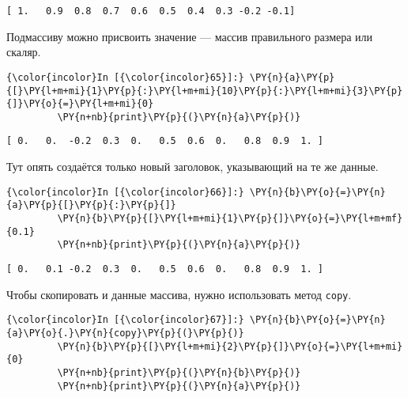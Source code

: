    \begin{Verbatim}[commandchars=\\\{\}]
[ 1.   0.9  0.8  0.7  0.6  0.5  0.4  0.3 -0.2 -0.1]

    \end{Verbatim}

    Подмассиву можно присвоить значение --- массив правильного размера или
скаляр.

    \begin{Verbatim}[commandchars=\\\{\}]
{\color{incolor}In [{\color{incolor}65}]:} \PY{n}{a}\PY{p}{[}\PY{l+m+mi}{1}\PY{p}{:}\PY{l+m+mi}{10}\PY{p}{:}\PY{l+m+mi}{3}\PY{p}{]}\PY{o}{=}\PY{l+m+mi}{0}
         \PY{n+nb}{print}\PY{p}{(}\PY{n}{a}\PY{p}{)}
\end{Verbatim}

    \begin{Verbatim}[commandchars=\\\{\}]
[ 0.   0.  -0.2  0.3  0.   0.5  0.6  0.   0.8  0.9  1. ]

    \end{Verbatim}

    Тут опять создаётся только новый заголовок, указывающий на те же данные.

    \begin{Verbatim}[commandchars=\\\{\}]
{\color{incolor}In [{\color{incolor}66}]:} \PY{n}{b}\PY{o}{=}\PY{n}{a}\PY{p}{[}\PY{p}{:}\PY{p}{]}
         \PY{n}{b}\PY{p}{[}\PY{l+m+mi}{1}\PY{p}{]}\PY{o}{=}\PY{l+m+mf}{0.1}
         \PY{n+nb}{print}\PY{p}{(}\PY{n}{a}\PY{p}{)}
\end{Verbatim}

    \begin{Verbatim}[commandchars=\\\{\}]
[ 0.   0.1 -0.2  0.3  0.   0.5  0.6  0.   0.8  0.9  1. ]

    \end{Verbatim}

    Чтобы скопировать и данные массива, нужно использовать метод
\texttt{copy}.

    \begin{Verbatim}[commandchars=\\\{\}]
{\color{incolor}In [{\color{incolor}67}]:} \PY{n}{b}\PY{o}{=}\PY{n}{a}\PY{o}{.}\PY{n}{copy}\PY{p}{(}\PY{p}{)}
         \PY{n}{b}\PY{p}{[}\PY{l+m+mi}{2}\PY{p}{]}\PY{o}{=}\PY{l+m+mi}{0}
         \PY{n+nb}{print}\PY{p}{(}\PY{n}{b}\PY{p}{)}
         \PY{n+nb}{print}\PY{p}{(}\PY{n}{a}\PY{p}{)}
\end{Verbatim}

